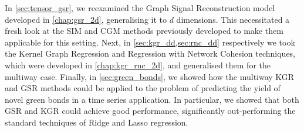 In \cref{sec:tensor_gsr}, we reexamined the Graph Signal Reconstruction model developed in \cref{chap:gsr_2d}, generalising it to $d$ dimensions. This necessitated a fresh look at the SIM and CGM methods previously developed to make them applicable for this setting. Next, in \cref{sec:kgr_dd,sec:rnc_dd} respectively we took the Kernel Graph Regression and Regression with Network Cohesion techniques, which were developed in \cref{chap:kgr_rnc_2d}, and generalised them for the multiway case. Finally, in \cref{sec:green_bonds}, we showed how the multiway KGR and GSR methods could be applied to the problem of predicting the yield of novel green bonds in a time series application. In particular, we showed that both GSR and KGR could achieve good performance, significantly out-performing the standard techniques of Ridge and Lasso regression. 

